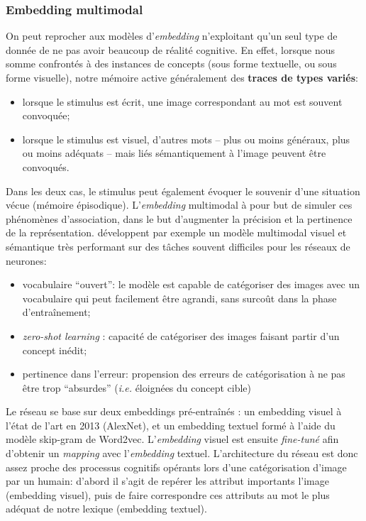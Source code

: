 \documentclass[french]{article}
\begin{document}
			\subsubsection{Embedding multimodal}
				On peut reprocher aux modèles d'\textit{embedding} n'exploitant qu'un seul type de donnée de ne pas avoir beaucoup de réalité cognitive. En effet, lorsque nous somme confrontés à des instances de concepts (sous forme textuelle, ou sous forme visuelle), notre mémoire active généralement des \textbf{traces de types variés}:
				\begin{itemize}
					\item lorsque le stimulus est écrit, une image correspondant au mot est souvent convoquée;
					\item lorsque le stimulus est visuel, d'autres mots -- plus ou moins généraux, plus ou moins adéquats -- mais liés sémantiquement à l'image peuvent être convoqués.
				\end{itemize}
				Dans les deux cas, le stimulus peut également évoquer le souvenir d'une situation vécue (mémoire épisodique). L'\textit{embedding} multimodal à pour but de simuler ces phénomènes d'association, dans le but d'augmenter la précision et la pertinence de la représentation. \cite{frome2013} développent par exemple un modèle multimodal visuel et sémantique très performant sur des tâches souvent difficiles pour les réseaux de neurones:
				\begin{itemize}
					\item vocabulaire ``ouvert'': le modèle est capable de catégoriser des images avec un vocabulaire qui peut facilement être agrandi, sans surcoût dans la phase d'entraînement;
					\item \textit{zero-shot learning} : capacité de catégoriser des images faisant partir d'un concept inédit;
					\item pertinence dans l'erreur: propension des erreurs de catégorisation à ne pas être trop ``absurdes'' (\textit{i.e.} éloignées du concept cible)  
				\end{itemize}
				Le réseau se base sur deux embeddings pré-entraînés : un embedding visuel à l'état de l'art en 2013 (AlexNet), et un embedding textuel formé à l'aide du modèle skip-gram de Word2vec. L'\textit{embedding} visuel est ensuite \textit{fine-tuné} afin d'obtenir un \textit{mapping} avec l'\textit{embedding} textuel. L'architecture du réseau est donc assez proche des processus cognitifs opérants lors d'une catégorisation d'image par un humain: d'abord il s'agit de repérer les attribut importants l'image (embedding visuel), puis de faire correspondre ces attributs au mot le plus adéquat de notre lexique (embedding textuel). \\
				
\end{document}
